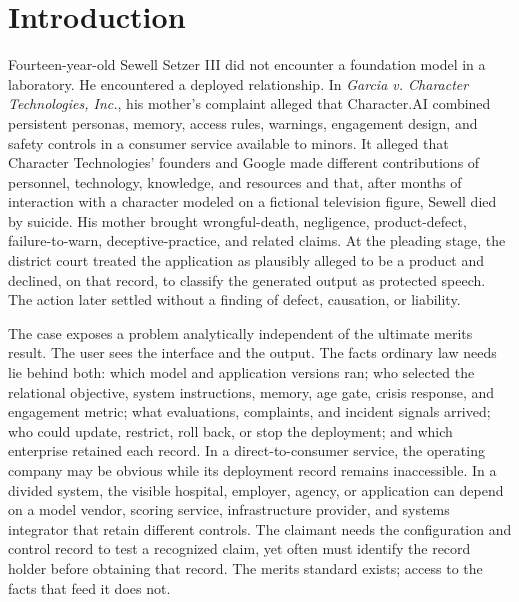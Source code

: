 \section*{Introduction}
\label{sec:introduction}

Fourteen-year-old Sewell Setzer III did not encounter a foundation model in a laboratory. He encountered a deployed relationship. In \emph{Garcia v. Character Technologies, Inc.}, his mother's complaint alleged that Character.AI combined persistent personas, memory, access rules, warnings, engagement design, and safety controls in a consumer service available to minors. It alleged that Character Technologies' founders and Google made different contributions of personnel, technology, knowledge, and resources and that, after months of interaction with a character modeled on a fictional television figure, Sewell died by suicide. His mother brought wrongful-death, negligence, product-defect, failure-to-warn, deceptive-practice, and related claims. At the pleading stage, the district court treated the application as plausibly alleged to be a product and declined, on that record, to classify the generated output as protected speech. The action later settled without a finding of defect, causation, or liability.

The case exposes a problem analytically independent of the ultimate merits result. The user sees the interface and the output. The facts ordinary law needs lie behind both: which model and application versions ran; who selected the relational objective, system instructions, memory, age gate, crisis response, and engagement metric; what evaluations, complaints, and incident signals arrived; who could update, restrict, roll back, or stop the deployment; and which enterprise retained each record. In a direct-to-consumer service, the operating company may be obvious while its deployment record remains inaccessible. In a divided system, the visible hospital, employer, agency, or application can depend on a model vendor, scoring service, infrastructure provider, and systems integrator that retain different controls. The claimant needs the configuration and control record to test a recognized claim, yet often must identify the record holder before obtaining that record. The merits standard exists; access to the facts that feed it does not.

